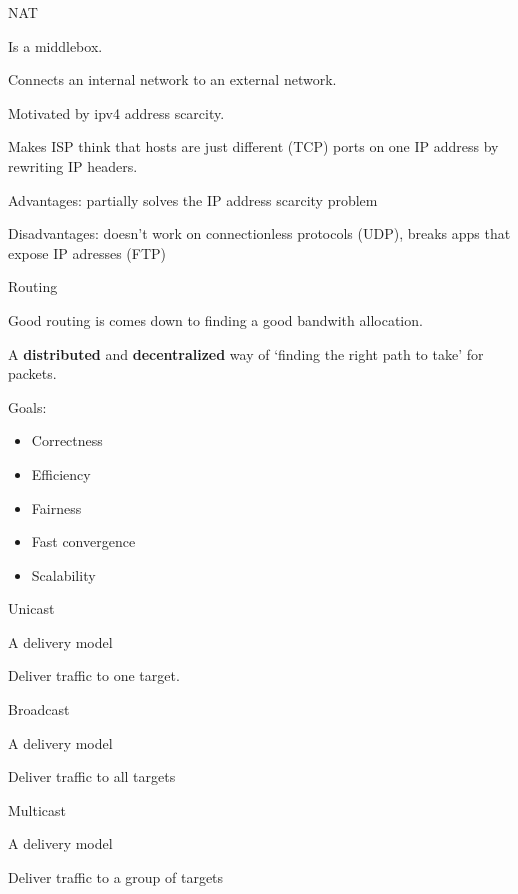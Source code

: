 \documentclass[main.tex]{subfiles}
\begin{document}
\begin{card}{NAT}
\item Is a middlebox.
\item Connects an internal network to an external network.
\item Motivated by ipv4 address scarcity.
\item Makes ISP think that hosts are just different (TCP) ports on one IP address by rewriting IP headers.
\item Advantages: partially solves the IP address scarcity problem
\item Disadvantages: doesn't work on connectionless protocols (UDP), breaks apps that expose IP adresses (FTP)
\end{card}

\begin{card}{Routing}
\item Good routing is comes down to finding a good bandwith allocation.
\item A \textbf{distributed} and \textbf{decentralized} way of `finding the right path to take' for packets.
\item Goals:
    \begin{itemize}
        \item Correctness
        \item Efficiency
        \item Fairness
        \item Fast convergence
        \item Scalability
    \end{itemize}
\end{card}

\begin{card}{Unicast}
\item A delivery model
\item Deliver traffic to one target.
\end{card}

\begin{card}{Broadcast}
\item A delivery model
\item Deliver traffic to all targets
\end{card}

\begin{card}{Multicast}
\item A delivery model
\item Deliver traffic to a group of targets
\end{card}
\end{document}
